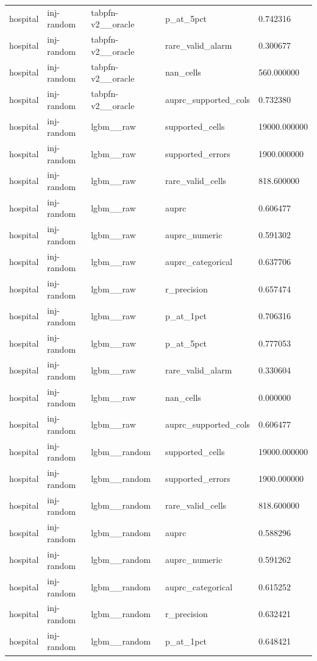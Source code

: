 \begin{tabular}{lllll}
hospital & inj-random & tabpfn-v2\_\_oracle & p\_at\_5pct & 0.742316 \\
hospital & inj-random & tabpfn-v2\_\_oracle & rare\_valid\_alarm & 0.300677 \\
hospital & inj-random & tabpfn-v2\_\_oracle & nan\_cells & 560.000000 \\
hospital & inj-random & tabpfn-v2\_\_oracle & auprc\_supported\_cols & 0.732380 \\
hospital & inj-random & lgbm\_\_raw & supported\_cells & 19000.000000 \\
hospital & inj-random & lgbm\_\_raw & supported\_errors & 1900.000000 \\
hospital & inj-random & lgbm\_\_raw & rare\_valid\_cells & 818.600000 \\
hospital & inj-random & lgbm\_\_raw & auprc & 0.606477 \\
hospital & inj-random & lgbm\_\_raw & auprc\_numeric & 0.591302 \\
hospital & inj-random & lgbm\_\_raw & auprc\_categorical & 0.637706 \\
hospital & inj-random & lgbm\_\_raw & r\_precision & 0.657474 \\
hospital & inj-random & lgbm\_\_raw & p\_at\_1pct & 0.706316 \\
hospital & inj-random & lgbm\_\_raw & p\_at\_5pct & 0.777053 \\
hospital & inj-random & lgbm\_\_raw & rare\_valid\_alarm & 0.330604 \\
hospital & inj-random & lgbm\_\_raw & nan\_cells & 0.000000 \\
hospital & inj-random & lgbm\_\_raw & auprc\_supported\_cols & 0.606477 \\
hospital & inj-random & lgbm\_\_random & supported\_cells & 19000.000000 \\
hospital & inj-random & lgbm\_\_random & supported\_errors & 1900.000000 \\
hospital & inj-random & lgbm\_\_random & rare\_valid\_cells & 818.600000 \\
hospital & inj-random & lgbm\_\_random & auprc & 0.588296 \\
hospital & inj-random & lgbm\_\_random & auprc\_numeric & 0.591262 \\
hospital & inj-random & lgbm\_\_random & auprc\_categorical & 0.615252 \\
hospital & inj-random & lgbm\_\_random & r\_precision & 0.632421 \\
hospital & inj-random & lgbm\_\_random & p\_at\_1pct & 0.648421 \\

\end{tabular}
